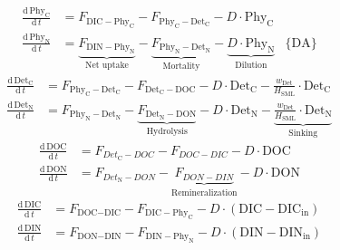 \documentclass[gmd, manuscript]{copernicus}
\begin{document}
\begin{subequations}\label{eq:phy}
 \begin{flalign}
  \label{eq:sPhyC}
  \frac{\mathrm{d}\, \text{Phy}_{\text{C}}}{\mathrm{d}\, t} &= F_{\text{DIC}-\text{Phy}_{\text{C}}} - F_{\text{Phy}_{\text{C}}-\text{Det}_{\text{C}}} - D \cdot \text{Phy}_{\text{C}}\\
  \label{eq:sPhyN}
  \frac{\mathrm{d}\, \text{Phy}_{\text{N}}}{\mathrm{d}\, t} &= \underbrace{F_{\text{DIN}-\text{Phy}_{\text{N}}}}_{\text{Net uptake}} - \underbrace{F_{\text{Phy}_{\text{N}}-\text{Det}_{\text{N}}}}_{\text{Mortality}} - \underbrace{D \cdot \text{Phy}_{\text{N}}}_{\text{Dilution}} &  \{\text{DA}\}
 \end{flalign}
\end{subequations}
\begin{subequations}\label{eq:det}
  \begin{flalign}
  \label{eq:sDetC}
  \frac{\mathrm{d}\, \text{Det}_{\text{C}}}{\mathrm{d}\, t} &= F_{\text{Phy}_{\text{C}}-\text{Det}_{\text{C}}} - F_{\text{Det}_{\text{C}}-\text{DOC}}  - D \cdot \text{Det}_{\text{C}} - \frac{w_{\text{Det}}}{H_{\text{SML}}} \cdot \text{Det}_{\text{C}} \\
  \label{eq:sDetN}
  \frac{\mathrm{d}\, \text{Det}_{\text{N}}}{\mathrm{d}\, t} &= F_{\text{Phy}_{\text{N}}-\text{Det}_{\text{N}}} - \underbrace{F_{\text{Det}_{\text{N}}-\text{DON}}}_\textrm{Hydrolysis} - D \cdot \text{Det}_{\text{N}} - \underbrace{\frac{w_{\text{Det}}}{H_{\text{SML}}} \cdot \text{Det}_{\text{N}}}_{\text{Sinking}}
\end{flalign}
\end{subequations}
\begin{subequations}\label{eq:dom}
  \begin{align}
   \label{eq:doc}
   \frac{\mathrm{d}\, \text{DOC}}{\mathrm{d}\, t} &= F_{Det_{\text{C}}-DOC} - F_{DOC-DIC} - D \cdot \text{DOC}\\
   \label{eq:don}
   \frac{\mathrm{d}\, \text{DON}}{\mathrm{d}\, t} &= F_{Det_{\text{N}}-DON} - \underbrace{F_{DON-DIN}}_\textrm{Remineralization} - D \cdot \text{DON}
  \end{align}
\end{subequations}
\begin{subequations}\label{eq:dim}
\begin{flalign}
  \label{eq:dic}
  \frac{\mathrm{d}\, \text{DIC}}{\mathrm{d}\, t} &= F_{\text{DOC}-\text{DIC}} - F_{\text{DIC}-\text{Phy}_{\text{C}}} - D \cdot(\text{DIC}-\text{DIC}_{\text{in}}) \\
  \label{eq:sdin}
  \frac{\mathrm{d}\,\text{DIN}}{\mathrm{d}\,t} &= F_{\text{DON}-\text{DIN}} - F_{\text{DIN}-\text{Phy}_{\text{N}}} - D \cdot (\text{DIN}-\text{DIN}_{\text{in}})
\end{flalign}
\end{subequations}
\end{document}
